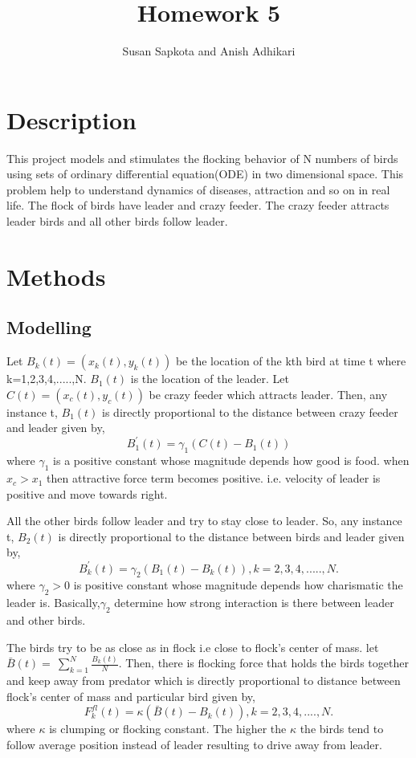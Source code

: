 \documentclass{article}
\author{Susan Sapkota and Anish Adhikari}
\begin{document}
\title{Homework 5}
\maketitle

\section{Description}
 This project models and stimulates the flocking behavior of N numbers of birds using sets of ordinary differential equation(ODE) in two dimensional space. This problem help to understand dynamics of diseases, attraction and so on in real life. The flock of birds have leader and crazy feeder. The crazy feeder attracts leader birds and all other birds follow leader. 
 \section{Methods}
 \subsection{Modelling}
Let $B_k(t) = (x_k(t),y_k(t))$  be the location of the kth bird at time t where k=1,2,3,4,.....,N. $B_1(t)$ is the location of the leader. Let $C(t) = (x_c(t),y_c(t))$ be crazy feeder which attracts leader. Then, any instance t, $B_1(t)$ is directly proportional to the distance between crazy feeder and leader given by, 
\begin{equation}
    B^{'}_1(t) = \gamma_1 (C(t)-B_1(t))     
\end{equation}
where $\gamma_1$ is a positive constant whose magnitude depends how good is food. when $x_c>x_1$ then attractive force term becomes positive. i.e. velocity of leader is positive and move towards right.

All the other birds follow leader and try to stay close to leader. So, any instance t, $B_2(t)$ is directly proportional to the distance between birds and leader given by, 
\begin{equation}
    B^{'}_k(t) = \gamma_2 (B_1(t)-B_k(t)),      k=2,3,4,.....,N.
\end{equation}
where $\gamma_2>0$ is positive constant whose magnitude depends how charismatic the leader is. Basically,$\gamma_2$ determine how strong interaction is there between leader and other birds.

The birds try to be as close as in flock i.e close to flock's center of mass.  let $\bar{B}(t)= \ \sum_{k=1}^N \frac{B_k(t)}{N}$. Then, there is flocking force that holds the birds together and keep away from predator which is directly proportional to distance between flock's center of mass and particular bird given by, 
\begin{equation}
    F^{fl}_k(t) = \kappa(\bar{B}(t)-B_k(t)),      k=2,3,4,....,N.
\end{equation}
where $\kappa$ is clumping or flocking constant. The higher the $\kappa$ the birds tend to follow average position instead of leader resulting to drive away from leader. 
\end{document}
